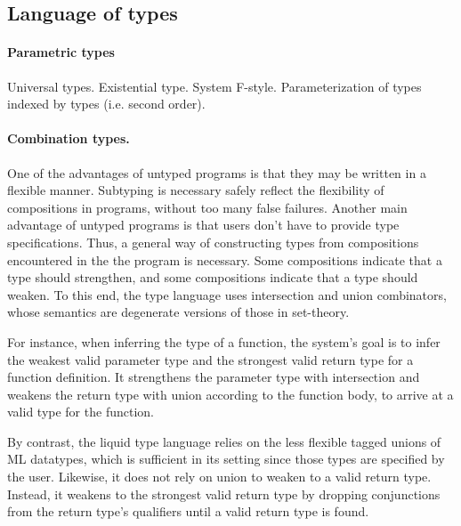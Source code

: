 \documentclass[acmsmall]{acmart}
\theoremstyle{definition}
\begin{document}
\subsection{Language of types}

\paragraph{Parametric types}
Universal types. Existential type. System F-style. Parameterization of types indexed by types (i.e. second order).


\paragraph{Combination types.}
One of the advantages of untyped programs is that they may be written in a flexible manner.
Subtyping is necessary safely reflect the flexibility of compositions in programs, without too many false failures.
Another main advantage of untyped programs is that users don't have to provide type specifications.
Thus, a general way of constructing types from compositions encountered in the the program is necessary.
Some compositions indicate that a type should strengthen, and some compositions indicate that a type should weaken.
To this end, the type language uses intersection and union combinators, 
whose semantics are degenerate versions of those in set-theory.

For instance, when inferring the type of a function, 
the system's goal is to infer the weakest valid parameter type and the strongest valid return type for a function definition.
It strengthens the parameter type with intersection and weakens the return type with union according to the function body,
to arrive at a valid type for the function.  

By contrast, the liquid type language relies on the less flexible tagged unions of ML datatypes, 
which is sufficient in its setting since those types are specified by the user. 
Likewise, it does not rely on union to weaken to a valid return type. 
Instead, it weakens to the strongest valid return type by dropping conjunctions from 
the return type's qualifiers until a valid return type is found.
\end{document}
